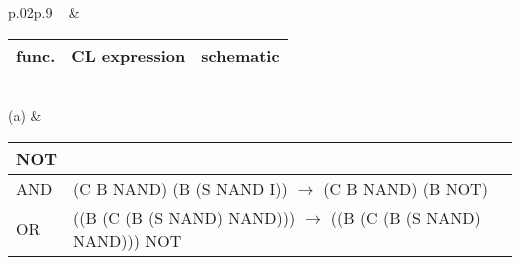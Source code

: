  
\begingroup\tabcolsep=2pt
\hspace{-10cm}\begin{table}[p]
\tiny
\begin{tabular}{p{.02\linewidth}p{.9\linewidth}}
 ~ & 
  \begin{tabular}{|m{.5cm}|m{2.5cm}|m{4.5cm}|}
    \hline
    func. & CL expression & schematic\\
    \hline\hline
  \end{tabular}\\
(a) & 
  \begin{tabular}{|m{.5cm}|m{2.5cm}|m{4.5cm}|}
    {\color{OliveGreen}NOT} & \color{OliveGreen}{(S NAND I)} & 
    \begin{tikzpicture}
      \node (x) at (0,0) {$x$};
      \node (nand)[nand gate US, draw, right=.6cm of x] {};
      \node (equiv)[right=.2cm of nand] {$\equiv$};
      \node (not) [not gate US, draw=OliveGreen, fill=OliveGreen!25, right=.2cm of equiv] {};

      \draw (x.east) -| +(.2, 0)  |- (nand.input 1);
      \draw (x.east) -| +(.2, 0)  |- (nand.input 2);

    \end{tikzpicture}\\
    \hline
    AND & (C B NAND) (B {\color{OliveGreen}(S NAND I)}) \newline
    $\rightarrow$ (C B NAND) (B {\color{OliveGreen}NOT}) & 
    \begin{tikzpicture}
      \node (y) at (0cm,1cm) {$y$};
      \node (x) at (0cm,0cm) {$x$};
      \node (nand) at (1cm, .5cm) [nand gate US, draw] {};
      \node (not) [not gate US, draw=OliveGreen, fill=OliveGreen!25, right=.4cm of nand] {};


      \draw(nand.output) -- (not.west);
      \draw (x.east) -| +(.1, 0)  |- (nand.input 2);
      \draw (y.east) -| +(.1, 0)  |- (nand.input 1);

    \end{tikzpicture}\\
    \hline
    OR & ((B (C (B (S NAND) NAND))) \newline {\color{OliveGreen}(S NAND I)} \newline
    $\rightarrow$ ((B (C (B (S NAND) NAND))) {\color{OliveGreen}NOT} & 
    \begin{tikzpicture}
      \node (y) at (0,1cm) {$y$};
      \node (x) at (0,0cm) {$x$};
      \node (not1) [not gate US, draw=OliveGreen, fill=OliveGreen!25, right=.4cm of y] {};
      \node (not2) [not gate US, draw=OliveGreen, fill=OliveGreen!25, right=.4cm of x] {};
      \node (nand)[nand gate US, draw] at (1.75, .5){};


\end{tikzpicture}
\end{tabular}
\end{tabular}
\end{table}
